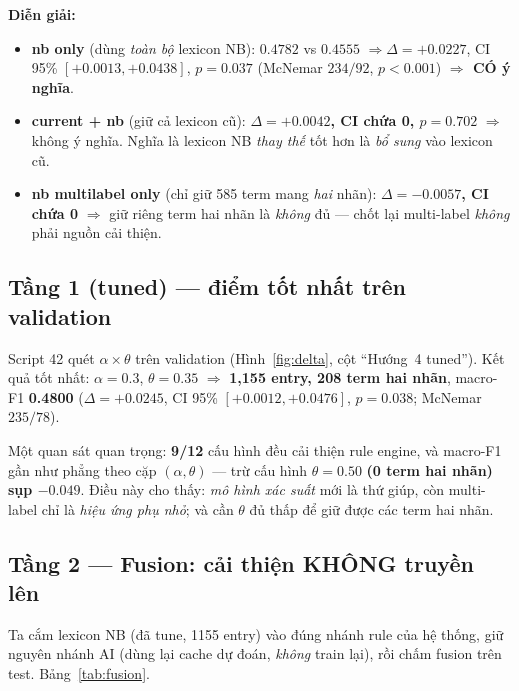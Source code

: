 \documentclass[11pt,a4paper]{article}
\newcommand{\ok}[1]{\textcolor{cok}{\textbf{#1}}}
\newcommand{\bad}[1]{\textcolor{cfail}{\textbf{#1}}}
\begin{document}
\textbf{Diễn giải:}
\begin{itemize}[leftmargin=1.6em]
  \item \textbf{nb only} (dùng \emph{toàn bộ} lexicon NB): $0.4782$ vs $0.4555$
  $\Rightarrow \Delta=+0.0227$, CI 95\% $[+0.0013,+0.0438]$, $p=0.037$
  (McNemar $234/92$, $p<0.001$) \ok{$\Rightarrow$ CÓ ý nghĩa}.
  \item \textbf{current + nb} (giữ cả lexicon cũ): \bad{$\Delta=+0.0042$,
  CI chứa 0, $p=0.702$} $\Rightarrow$ không ý nghĩa.  Nghĩa là lexicon NB
  \emph{thay thế} tốt hơn là \emph{bổ sung} vào lexicon cũ.
  \item \textbf{nb multilabel only} (chỉ giữ 585 term mang \emph{hai} nhãn):
  \bad{$\Delta=-0.0057$, CI chứa 0} $\Rightarrow$ giữ riêng term hai nhãn là
  \emph{không} đủ --- chốt lại multi-label \emph{không} phải nguồn cải thiện.
\end{itemize}

\subsection{Tầng 1 (tuned) --- điểm tốt nhất trên validation}
\label{sec:res-tuned}

Script 42 quét $\alpha \times \theta$ trên validation (Hình~\ref{fig:delta},
cột ``Hướng~4 tuned'').  Kết quả tốt nhất: $\alpha=0.3$, $\theta=0.35$
$\Rightarrow$ \textbf{1{,}155 entry, 208 term hai nhãn}, macro-F1 \ok{0.4800}
($\Delta=+0.0245$, CI 95\% $[+0.0012,+0.0476]$, $p=0.038$; McNemar $235/78$).

Một quan sát quan trọng: \textbf{9/12} cấu hình đều cải thiện rule engine, và
macro-F1 gần như phẳng theo cặp $(\alpha,\theta)$ --- trừ cấu hình $\theta=0.50$
\bad{(0 term hai nhãn) sụp $-0.049$}.  Điều này cho thấy:
\emph{mô hình xác suất} mới là thứ giúp, còn multi-label chỉ là \emph{hiệu ứng
phụ nhỏ}; và cần $\theta$ đủ thấp để giữ được các term hai nhãn.

\subsection{Tầng 2 --- Fusion: cải thiện KHÔNG truyền lên}
\label{sec:res-fusion}

Ta cắm lexicon NB (đã tune, 1155 entry) vào đúng nhánh rule của hệ thống, giữ
nguyên nhánh AI (dùng lại cache dự đoán, \emph{không} train lại), rồi chấm
fusion trên test.  Bảng~\ref{tab:fusion}.
\end{document}
